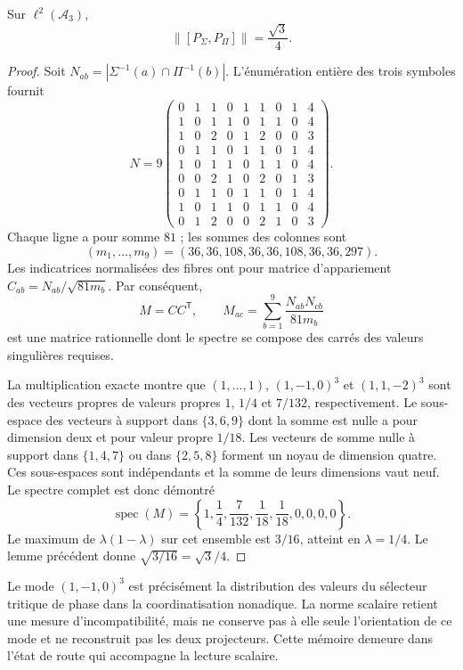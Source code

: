 \begin{proposition}
Sur \(\ell^2(\mathcal A_3)\),
\begin{equation}
 \|[P_\Sigma,P_\Pi]\|=\frac{\sqrt3}{4}.
 \label{eq:el-prefactor}
\end{equation}
\end{proposition}
\begin{proof}
Soit \(N_{ab}=|\Sigma^{-1}(a)\cap\Pi^{-1}(b)|\). L'énumération entière
des trois symboles fournit
\[
 N=9\begin{pmatrix}
 0&1&1&0&1&1&0&1&4\\
 1&0&1&1&0&1&1&0&4\\
 1&0&2&0&1&2&0&0&3\\
 0&1&1&0&1&1&0&1&4\\
 1&0&1&1&0&1&1&0&4\\
 0&0&2&1&0&2&0&1&3\\
 0&1&1&0&1&1&0&1&4\\
 1&0&1&1&0&1&1&0&4\\
 0&1&2&0&0&2&1&0&3
 \end{pmatrix}.
\]
Chaque ligne a pour somme \(81\) ; les sommes des colonnes sont
\[
 (m_1,\ldots,m_9)=(36,36,108,36,36,108,36,36,297).
\]
Les indicatrices normalisées des fibres ont pour matrice
d'appariement \(C_{ab}=N_{ab}/\sqrt{81m_b}\). Par conséquent,
\[
 M=CC^{\mathsf T},\qquad
 M_{ac}=\sum_{b=1}^9\frac{N_{ab}N_{cb}}{81m_b}
\]
est une matrice rationnelle dont le spectre se compose des carrés des
valeurs singulières requises.

La multiplication exacte montre que \((1,\ldots,1)\),
\((1,-1,0)^3\) et \((1,1,-2)^3\) sont des vecteurs propres de valeurs propres
\(1\), \(1/4\) et \(7/132\), respectivement. Le sous-espace des
vecteurs à support dans \(\{3,6,9\}\) dont la somme est nulle a pour dimension
deux et pour valeur propre \(1/18\). Les vecteurs de somme nulle à support dans
\(\{1,4,7\}\) ou dans \(\{2,5,8\}\) forment un noyau de dimension
quatre. Ces sous-espaces sont indépendants et la somme de leurs dimensions vaut
neuf. Le spectre complet est donc démontré
\[
 \operatorname{spec}(M)=
 \left\{1,\frac14,\frac7{132},\frac1{18},\frac1{18},0,0,0,0\right\}.
\]
Le maximum de \(\lambda(1-\lambda)\) sur cet ensemble est \(3/16\), atteint en \(\lambda=1/4\). Le lemme précédent donne \(\sqrt{3/16}=\sqrt3/4\).
\end{proof}

Le mode \((1,-1,0)^3\) est précisément la distribution des valeurs du
sélecteur tritique de phase dans la coordinatisation nonadique. La norme scalaire retient
une mesure d'incompatibilité, mais ne conserve pas à elle seule
l'orientation de ce mode et ne reconstruit pas les deux projecteurs. Cette mémoire
demeure dans l'état de route qui accompagne la lecture scalaire.


